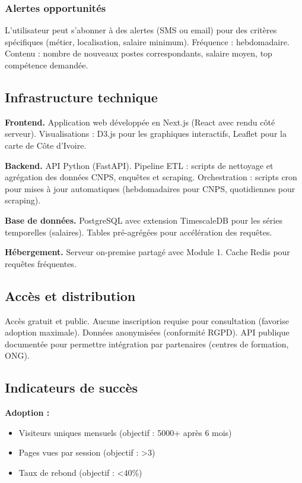 \documentclass[12pt]{article}
\begin{document}
\subsubsection{Alertes opportunités}

L'utilisateur peut s'abonner à des alertes (SMS ou email) pour des critères spécifiques (métier, localisation, salaire minimum). Fréquence : hebdomadaire. Contenu : nombre de nouveaux postes correspondants, salaire moyen, top compétence demandée.

\subsection{Infrastructure technique}

\textbf{Frontend.} Application web développée en Next.js (React avec rendu côté serveur). Visualisations : D3.js pour les graphiques interactifs, Leaflet pour la carte de Côte d'Ivoire.

\textbf{Backend.} API Python (FastAPI). Pipeline ETL : scripts de nettoyage et agrégation des données CNPS, enquêtes et scraping. Orchestration : scripts cron pour mises à jour automatiques (hebdomadaires pour CNPS, quotidiennes pour scraping).

\textbf{Base de données.} PostgreSQL avec extension TimescaleDB pour les séries temporelles (salaires). Tables pré-agrégées pour accélération des requêtes.

\textbf{Hébergement.} Serveur on-premise partagé avec Module 1. Cache Redis pour requêtes fréquentes.

\subsection{Accès et distribution}

Accès gratuit et public. Aucune inscription requise pour consultation (favorise adoption maximale). Données anonymisées (conformité RGPD). API publique documentée pour permettre intégration par partenaires (centres de formation, ONG).

\subsection{Indicateurs de succès}

\textbf{Adoption :}
\begin{itemize}
    \item Visiteurs uniques mensuels (objectif : 5000+ après 6 mois)
    \item Pages vues par session (objectif : >3)
    \item Taux de rebond (objectif : <40\%)
\end{itemize}
\end{document}
